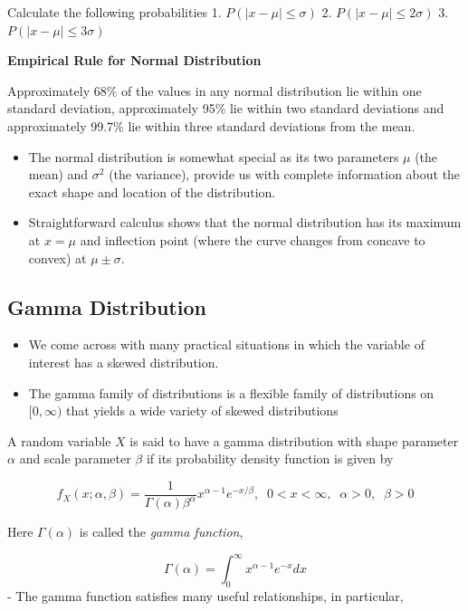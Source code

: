 \documentclass[]{book}
\begin{document}
Calculate the following probabilities
1. \(P(|x-\mu|\leq \sigma)\)
2. \(P(|x-\mu|\leq 2\sigma)\)
3. \(P(|x-\mu|\leq 3\sigma)\)

\textbf{Empirical Rule for Normal Distribution}

Approximately 68\% of the values in any normal distribution lie within one standard deviation, approximately 95\% lie within two standard deviations and approximately 99.7\% lie within three standard deviations from the mean.

\begin{itemize}
\item
  The normal distribution is somewhat special as its two parameters \(\mu\) (the mean) and \(\sigma^2\) (the variance), provide us with complete information about the exact shape and location of the distribution.
\item
  Straightforward calculus shows that the normal distribution has its maximum at \(x=\mu\) and inflection point (where the curve changes from concave to convex) at \(\mu \pm\sigma.\)
\end{itemize}

\hypertarget{gamma-distribution}{%
\subsection{Gamma Distribution}\label{gamma-distribution}}

\begin{itemize}
\item
  We come across with many practical situations in which the variable of interest has a skewed distribution.
\item
  The gamma family of distributions is a flexible family of distributions on \([0,\infty)\) that yields a wide variety of skewed distributions
\end{itemize}

A random variable \(X\) is said to have a gamma distribution with shape parameter \(\alpha\) and scale parameter \(\beta\) if its probability density function is given by

\[f_X(x;\alpha, \beta)= \frac{1}{\Gamma(\alpha)\beta ^ {\alpha}}x^{\alpha-1}e^{-x/\beta}, \;\; 0<x<\infty,\;\; \alpha >0, \;\;\beta >0\]

Here \(\Gamma(\alpha)\) is called the \emph{gamma function},

\[\Gamma(\alpha)=\int_0^{\infty}x^{\alpha-1}e^{-x}dx\]
- The gamma function satisfies many useful relationships, in particular,
\end{document}
